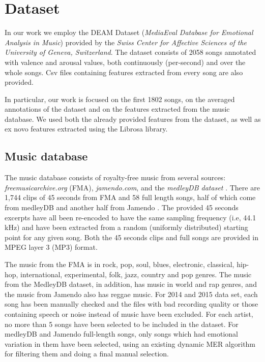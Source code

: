 \section{Dataset}\label{sec:dataset}

In our work we employ the DEAM Dataset (\textit{MediaEval Database for Emotional Analysis in Music}) provided by the \textit{Swiss Center for Affective Sciences of the University of Geneva, Switzerland}.
The dataset consists of 2058 songs annotated with valence and arousal values, both continuously (per-second) and over the whole songs. Csv files containing features extracted from every song are also provided.

In particular, our work is focused on the first 1802 songs, on the averaged annotations of the dataset and on the features extracted from the music database. We used both the already provided features from the dataset, as well as ex novo features extracted using the Librosa library.

\subsection{Music database}\label{sec:database}

The music database consists of royalty-free music from several sources: \textit{freemusicarchive.org} (FMA), \textit{jamendo.com}, and the \textit{medleyDB dataset} \cite{bittner2014medleydb}. There are 1,744 clips of 45 seconds from FMA and 58 full length songs, half of which come from medleyDB and another half from Jamendo \cite{aljanaki2017developing}.
The provided 45 seconds excerpts have all been re-encoded to have the same sampling frequency (i.e, 44.1\,kHz) and have been extracted from a random (uniformly distributed) starting point for any given song. Both the 45 seconds clips and full songs are provided in MPEG layer 3 (MP3) format.\cite{soleymani2016deam}

The music from the FMA is in rock, pop, soul, blues, electronic, classical, hip-hop, international, experimental, folk, jazz, country and pop genres. The music from the MedleyDB dataset, in addition, has music in world and rap genres, and the music from Jamendo also has reggae music. For 2014 and 2015 data set, each song has been manually checked and the files with bad recording quality or those containing speech or noise instead of music have been excluded. For each artist, no more than 5 songs have been selected to be included in the dataset. For medleyDB and Jamendo full-length songs, only songs which had emotional variation in them have been selected, using an existing dynamic MER algorithm for filtering them and doing a final manual selection\cite{anna2015emotion}.


